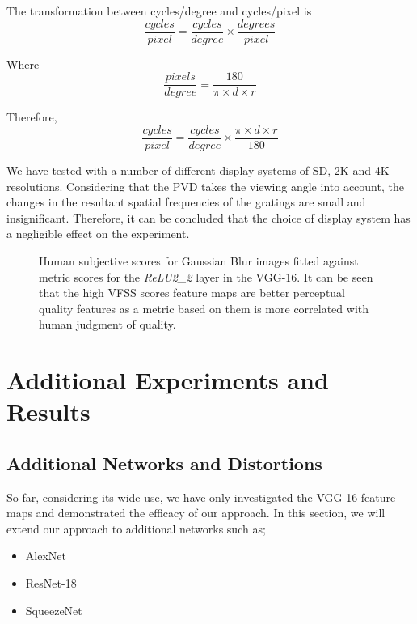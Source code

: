 \documentclass[10pt,twocolumn,letterpaper]{article}
\begin{document}
The transformation between cycles/degree and cycles/pixel is
\begin{equation}
   \frac{cycles}{pixel} = \frac{cycles}{degree} \times \frac{degrees}{pixel}
\end{equation}

Where 
\begin{equation}
   \frac{pixels}{degree} = \frac{180}{\pi \times d \times r}
\end{equation}

Therefore,
\begin{equation}
   \frac{cycles}{pixel} = \frac{cycles}{degree} \times \frac{\pi \times d \times r}{180}
\end{equation}

We have tested with a number of different display systems of SD, 2K and 4K resolutions. Considering that the PVD takes the viewing angle into account, the changes in the resultant spatial frequencies of the gratings are small and insignificant. Therefore, it can be concluded that the choice of display system has a negligible effect on the experiment. 

\begin{figure}[bt!]

  \hfill
  \caption{Human subjective scores for Gaussian Blur images fitted against metric scores for the \textit{ReLU2\_2} layer in the VGG-16. It can be seen that the high VFSS scores feature maps are better perceptual quality features as a metric based on them is more correlated with human judgment of quality. }
\end{figure}

\section{Additional Experiments and Results}
\subsection{Additional Networks and Distortions}
So far, considering its wide use, we have only investigated the VGG-16 feature maps and demonstrated the efficacy of our approach. In this section, we will extend our approach to additional networks such as;
\begin{itemize}
 \item AlexNet \cite{35}
 \item ResNet-18 \cite{33}
 \item SqueezeNet \cite{34}
\end{itemize}
\end{document}
